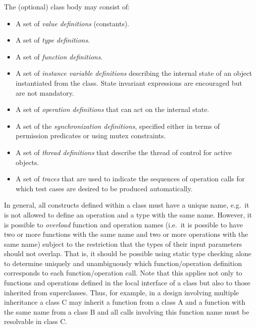 \documentclass{overturerepchap}
\begin{document}
\begin{description}
The (optional) class body may consist of:
\begin{itemize}
\item A set of {\it value definitions} (constants).
\item A set of {\it type definitions}.
\item A set of {\it function definitions}.
\item A set of {\it instance variable definitions} describing
  the internal state of an object instantiated from the
  class. State invariant expressions are encouraged but are not mandatory.
\item A set of {\it operation definitions} that can act on the internal state.
\item A set of the {\it synchronization definitions}, specified either 
  in terms of permission predicates or using mutex constraints.
\item A set of {\it thread definitions} that describe the thread of control
  for active objects.
\item A set of {\it traces} that are used to indicate the sequences of 
operation calls for which test cases are desired to be produced automatically.
\end{itemize}

In general, all constructs defined within a class must have a unique
name, e.g.\ it is not allowed to define an operation and a type with
the same name. However, it is possible to {\it overload} function and
operation names (i.e.\ it is possible to have two or more functions
with the same name and two or more operations with the same name)
subject to the restriction that the types of their input parameters
should not overlap. That is,  it should be possible using static type
checking alone to determine uniquely and unambiguously which
function/operation definition corresponds to each function/operation
call. Note that this applies not only to functions and operations
defined in the local interface of a class but also to those inherited
from superclasses. Thus, for example, in a design involving multiple
inheritance a class C may inherit a function from a class A and a
function with the same name from a class B and all calls involving
this function name must be resolvable in class C.
\end{description}
\end{document}

